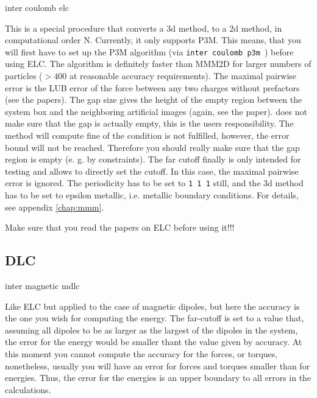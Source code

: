 \begin{essyntax}
  inter coulomb elc  
  \begin{features}
  \end{features}
\end{essyntax}
This is a special procedure that converts a 3d method, to a 2d method,
in computational order N. Currently, it only supports P3M. This means,
that you will first have to set up the P3M algorithm (via
\texttt{inter coulomb p3m }) before using ELC.  The
algorithm is definitely faster than MMM2D for larger numbers of
particles ($>400$ at reasonable accuracy requirements). The maximal
pairwise error is the LUB error of the force between any two charges
without prefactors (see the papers).  The gap size gives the height of
the empty region between the system box and the neighboring artificial
images (again, see the paper).  \es{} does not make sure that the gap
is actually empty, this is the users responsibility. The method will
compute fine of the condition is not fulfilled, however, the error
bound will not be reached. Therefore you should really make sure that
the gap region is empty (e. g. by constraints). The far cutoff finally
is only intended for testing and allows to directly set the cutoff. In
this case, the maximal pairwise error is ignored. The periodicity has
to be set to \texttt{1 1 1} still, and the 3d method has to be set to
epsilon metallic, i.e.  metallic boundary conditions. For details, see
appendix \vref{chap:mmm}.

Make sure that you read the papers on ELC before using it!!!

\subsection{DLC}

\begin{essyntax}
  inter magnetic  mdlc  
  \begin{features}
  \end{features}
\end{essyntax}

Like ELC but applied to the case of magnetic dipoles, but here the
accuracy is the one you wish for computing the energy.  The far-cutoff
is set to a value that, assuming all dipoles to be as larger as the
largest of the dipoles in the system, the error for the energy would
be smaller thant the value given by accuracy. At this moment you
cannot compute the accuracy for the forces, or torques, nonetheless,
usually you will have an error for forces and torques smaller than for
energies. Thus, the error for the energies is an upper boundary to all
errors in the calculations.

